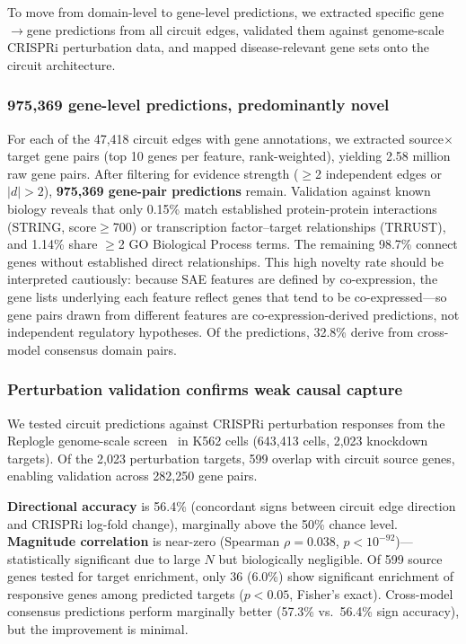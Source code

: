 \documentclass[onecolumn]{article}
\begin{document}
To move from domain-level to gene-level predictions, we extracted specific gene$\to$gene predictions from all circuit edges, validated them against genome-scale CRISPRi perturbation data, and mapped disease-relevant gene sets onto the circuit architecture.

\subsubsection{975,369 gene-level predictions, predominantly novel}

For each of the 47,418 circuit edges with gene annotations, we extracted source$\times$target gene pairs (top 10 genes per feature, rank-weighted), yielding 2.58 million raw gene pairs. After filtering for evidence strength ($\geq$2 independent edges or $|d| > 2$), \textbf{975,369 gene-pair predictions} remain. Validation against known biology reveals that only 0.15\% match established protein-protein interactions (STRING, score$\geq$700) or transcription factor--target relationships (TRRUST), and 1.14\% share $\geq$2 GO Biological Process terms. The remaining 98.7\% connect genes without established direct relationships. This high novelty rate should be interpreted cautiously: because SAE features are defined by co-expression, the gene lists underlying each feature reflect genes that tend to be co-expressed---so gene pairs drawn from different features are co-expression-derived predictions, not independent regulatory hypotheses. Of the predictions, 32.8\% derive from cross-model consensus domain pairs.

\subsubsection{Perturbation validation confirms weak causal capture}

We tested circuit predictions against CRISPRi perturbation responses from the Replogle genome-scale screen~\citep{replogle2022mapping} in K562 cells (643,413 cells, 2,023 knockdown targets). Of the 2,023 perturbation targets, 599 overlap with circuit source genes, enabling validation across 282,250 gene pairs.

\textbf{Directional accuracy} is 56.4\% (concordant signs between circuit edge direction and CRISPRi log-fold change), marginally above the 50\% chance level. \textbf{Magnitude correlation} is near-zero (Spearman $\rho = 0.038$, $p < 10^{-92}$)---statistically significant due to large $N$ but biologically negligible. Of 599 source genes tested for target enrichment, only 36 (6.0\%) show significant enrichment of responsive genes among predicted targets ($p < 0.05$, Fisher's exact). Cross-model consensus predictions perform marginally better (57.3\% vs.\ 56.4\% sign accuracy), but the improvement is minimal.
\end{document}

